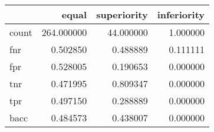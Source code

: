 \begin{tabular}{lrrr}
\toprule
{} &       equal &  superiority &  inferiority \\
\midrule
count &  264.000000 &    44.000000 &     1.000000 \\
fnr   &    0.502850 &     0.488889 &     0.111111 \\
fpr   &    0.528005 &     0.190653 &     0.000000 \\
tnr   &    0.471995 &     0.809347 &     0.000000 \\
tpr   &    0.497150 &     0.288889 &     0.000000 \\
bacc  &    0.484573 &     0.438007 &     0.000000 \\
\bottomrule
\end{tabular}
